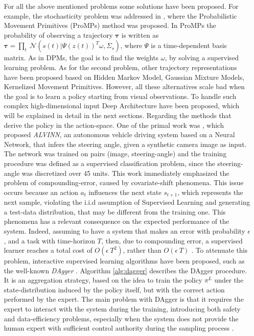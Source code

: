 For all the above mentioned problems some solutions have been proposed. For example, the stochasticity problem was addressed in \cite{paraschos2013ProMPs}, where the Probabilistic Movement Primitives (ProMPs) method was proposed. In ProMPs the probability of observing a trajectory $\boldsymbol{\tau}$ is written as $\boldsymbol{\tau} = \underset{t}{\prod} \ \mathcal{N}(s(t)|\Psi(z(t))^{T}\omega, \Sigma_{s})$, where $\Psi$ is a time-dependent basis matrix. As in DPMs, the goal is to find the weights $\omega$, by solving a supervised learning problem. As for the second problem, other trajectory representations have been proposed based on Hidden Markov Model, Gaussian Mixture Models, Kernelized Movement Primitives. However, all these alternatives scale bad when the goal is to learn a policy starting from visual observations. To handle such complex high-dimensional input Deep Architecture have been proposed, which will be explained in detail in the next sections. 
\newline Regarding the methods that derive the policy in the action-space. One of the primal work was \cite{pomerleau1988alvinn}, which proposed \textit{ALVINN}, an autonomous vehicle driving system based on a Neural Network, that infers the steering angle, given a synthetic camera image as input. The network was trained on pairs (image, steering-angle) and the training procedure was defined as a supervised classification problem, since the steering-angle was discretized over 45 units. This work immediately emphasized the problem of compounding-error, caused by covariate-shift phenomena. This issue occurs because an action $a_{t}$ influences the next state $s_{t+1}$, which represents the next sample, violating the i.i.d assumption of Supervised Learning and generating a test-data distribution, that may be different from the training one. This phenomena has a relevant consequence on the expected performance of the system. Indeed, assuming to have a system that makes an error with probability $\epsilon$, and a task with time-horizon $T$, then, due to compounding error, a supervised learner reaches a total cost of $O(\epsilon \ T^{2})$, rather than $O(\epsilon \ T)$ \cite{ross2010efficient_reductions,ross2011dagger}. To attenuate this problem, interactive supervised learning algorithms have been proposed, such as the well-known \textit{DAgger} \cite{ross2011dagger}. Algorithm \ref{alg:dagger} describes the DAgger procedure. It is an aggregation strategy, based on the idea to train the policy $\pi^{L}$ under the state-distribution induced by the policy itself, but with the correct action performed by the expert. The main problem with DAgger is that it requires the expert to interact with the system during the training, introducing both safety and data-efficiency problems, especially when the system does not provide the human expert with sufficient control authority during the sampling process \cite{laskey2017comparing_hc_rc}. 
